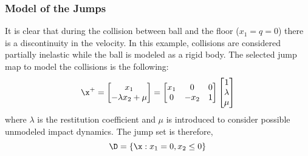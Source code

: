 \subsubsection{Model of the Jumps}
%
It is clear that during the collision between ball and the floor ($x_1 = q =0$) there is a discontinuity in the velocity. In this example, collisions are considered partially inelastic while the ball is modeled as a rigid body. The selected jump map to model the collisions is the following:
%
\begin{align}
	\x^+=\begin{bmatrix}x_1\\-\lambda x_2+\mu\end{bmatrix} = \begin{bmatrix}x_1&0&0\\0&-x_2&1\end{bmatrix}\begin{bmatrix}1\\\lambda\\\mu\end{bmatrix}
\end{align}
%
{where $\lambda$ is the restitution coefficient and $\mu$ is introduced to consider possible unmodeled impact dynamics}. The jump set is therefore,
%
\begin{equation}
    \D=\{\x:x_1=0,x_2\leq 0\}
\end{equation}
%
